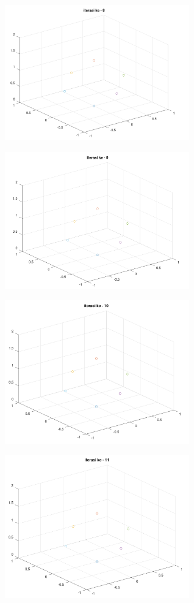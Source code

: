 \documentclass[11pt]{article}
\begin{document}
\begin{multicols}{2}
    \includegraphics[width=8cm]{img/Iterasi08.PNG}

    \includegraphics[width=8cm]{img/Iterasi09.PNG}

    \includegraphics[width=8cm]{img/Iterasi10.PNG}

    \includegraphics[width=8cm]{img/Iterasi11.PNG}
\end{multicols}
\end{document}
